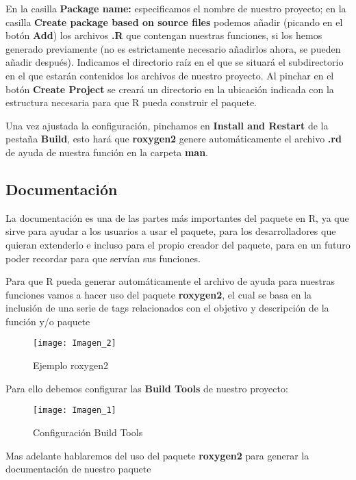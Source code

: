 En la casilla \textbf{Package name:} especificamos el nombre de nuestro proyecto; en la casilla
\textbf{Create package based on source files} podemos a\~nadir (picando en el bot\'on \textbf{Add}) los
archivos \textbf{.R} que contengan nuestras funciones, si los hemos generado previamente (no es
estrictamente necesario a\~nadirlos ahora, se pueden a\~nadir despu\'es).
Indicamos el directorio ra\'iz en el que se situar\'a el subdirectorio en el que estar\'an
contenidos los archivos de nuestro proyecto. 
Al pinchar en el bot\'on \textbf{Create Project} se crear\'a un directorio en la ubicaci\'on indicada con la
estructura necesaria para que R pueda construir el paquete.

Una vez ajustada la configuraci\'on, pinchamos en \textbf{Install and Restart} de la pesta\~na \textbf{Build}, esto har\'a que \textbf{roxygen2} genere autom\'aticamente el archivo \textbf{.rd} de ayuda de nuestra funci\'on en la carpeta \textbf{man}.

\subsection{Documentaci\'on}

La documentaci\'on es una de las partes m\'as importantes del paquete en R, ya que sirve para
ayudar a los usuarios a usar el paquete, para los desarrolladores que quieran extenderlo e
incluso para el propio creador del paquete, para en un futuro poder recordar para que serv\'ian
sus funciones.

Para que R pueda generar autom\'aticamente el archivo de ayuda para nuestras funciones
vamos a hacer uso del paquete \textbf{roxygen2}, el cual se basa en la inclusi\'on de una serie de tags relacionados con el objetivo y descripci\'on de la funci\'on y/o paquete 


\begin{figure}[H]
    \centering
    \texttt{[image: Imagen\_2]}
    \caption{Ejemplo roxygen2   }
    \label{fig:roxygen}
\end{figure} 

Para ello debemos configurar las \textbf{Build Tools} de nuestro proyecto:

\begin{figure}[H]
    \centering
    \texttt{[image: Imagen\_1]}
    \caption{Configuraci\'on Build Tools }
    \label{fig:build_tools}
\end{figure} 

Mas adelante hablaremos del uso del paquete \textbf{roxygen2} para generar la documentaci\'on de nuestro paquete

